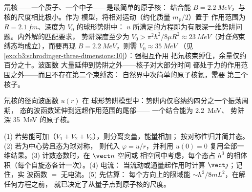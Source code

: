 \begin{example}[氘核：几乎算不上原子核]\label{ex:b3:schrodinger-three-dimensions:deuteron}
氘核——一个质子、一个中子——是最简单的原子核：
结合能 $B = \qty{2.2}{MeV}$，与核的尺度相比极小。作为
模型，将相对运动（约化质量 $m_{\text{p}}/2$）置于
作用范围为 $R = \qty{2.1}{fm}$、深度为 $V_0$ 的球形势阱中：
$u$ 所满足的方程即为有限深一维势阱问题。内外解的匹配要求，
势阱深度至少为 $V_0 > \pi^2\hbar^2/8\mu R^2
\approx \qty{23}{MeV}$（对\emph{任何}束缚态均成立），而要再现
$B = \qty{2.2}{MeV}$，则需 $V_0 \approx \qty{35}{MeV}$
（见\cref{exo:b3:schrodinger-three-dimensions:10}）：强相互作用
把氘核束缚住，余量仅约百分之十。波函数
大量延伸到势阱之外——核子对大部分时间
都处于力的作用范围之外——而且不存在第二个束缚态：
自然界中次简单的原子核氦，需要
第三个核子。
\end{example}

\begin{omfigure}

{\small 氘核的径向波函数 $u(r)$ 在
球形势阱模型中：势阱内仅容纳约四分之一个振荡周期，
态的波函数延伸到远超作用范围的尾部——
一个结合能为 \qty{2.2}{MeV}、
势阱深 \qty{35}{MeV} 的原子核。}
\end{omfigure}

\begin{method}[三维问题]\label{met:b3:schrodinger-three-dimensions:method}
(1) 若势能可加（$V_1 + V_2 + V_3$），则分离变量，能量相加；
按对称性归并简并态。(2) 若为中心势且态为球对称，
则代入 $\varphi = u/r$，并利用
$u(0) = 0$ 复用全部一维结果。(3) 计数态数时，在 $\vect n$ 空间或
相空间中考虑，每个态占 $h^3$ 的相体积（每个自旋态各计一次）。(4) 电流：
当流动或通量起作用时计算 $\vect\jmath$；记住，实
波函数 $=$ 无电流。(5) 先估算：
每个方向上的限域能 $\sim h^2/8mL^2$，在解任何方程之前，
就已决定了从量子点到原子核的尺度。
\end{method}

